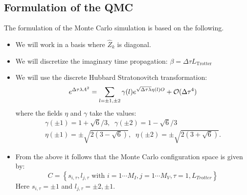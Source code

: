 \subsection{Formulation of the QMC}  
The formulation of the  Monte Carlo simulation is based on the following.
\begin{itemize}
\item  We will work in  a basis  where  $\hat{Z}_k$ is diagonal. 
\item  We will discretize the imaginary time propagation: $\beta = \Delta \tau L_{\text{Trotter}} $
\item  We will use  the   discrete Hubbard Stratonovitch transformation: 
\begin{equation}
\label{HS_squares}
        e^{\Delta \tau  \lambda  A^2 } =
        \sum_{ l = \pm 1, \pm 2}  \gamma(l)
e^{ \sqrt{\Delta \tau \lambda }
       \eta(l)  O }
                + {\cal O} (\Delta \tau ^4)
\end{equation}
where the fields $\eta$ and $\gamma$ take the values:
\begin{eqnarray}
 \gamma(\pm 1) = 1 + \sqrt{6}/3, \; \; \gamma(\pm 2) = 1 - \sqrt{6}/3
\nonumber \\
 \eta(\pm 1 ) = \pm \sqrt{2 \left(3 - \sqrt{6} \right)},  \; \;
 \eta(\pm 2 ) = \pm \sqrt{2 \left(3 + \sqrt{6} \right)}.
\nonumber
\end{eqnarray}
\item From the above it follows that   the Monte Carlo configuration space is given by: 
\begin{equation}
	C = \left\{   s_{i,\tau} ,  l_{j,\tau}  \text{ with }  i=1\cdots M_I,  j = 1\cdots M_V,  \tau=1,L_{Trotter}  \right\}
\end{equation}
Here $s_{i,\tau} = \pm 1$ and  $l_{j,\tau}  = \pm 2, \pm 1 $.
\end{itemize}

